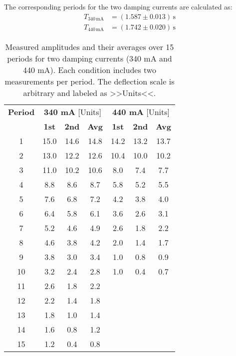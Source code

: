 The corresponding periods for the two damping currents are calculated as:
\begin{equation}
    \boxed{
        \begin{aligned}
        T_{340\,\mathrm{mA}} &= (1.587 \pm 0.013)\,\mathrm{s} \\
        T_{440\,\mathrm{mA}} &= (1.742 \pm 0.020)\,\mathrm{s}
    \end{aligned}
    }
\end{equation}

\begin{table}[h!]
    \centering
    \begin{tabular}{c|ccc|ccc}
        \hline
        \textbf{Period} & \multicolumn{3}{c|}{\textbf{340 mA} [Units]} & \multicolumn{3}{c}{\textbf{440 mA} [Units]} \\
        \cline{2-7}
        & \textbf{1st} & \textbf{2nd} & \textbf{Avg} & \textbf{1st} & \textbf{2nd} & \textbf{Avg} \\
        \hline
        1  & 15.0 & 14.6 & 14.8 & 14.2 & 13.2 & 13.7 \\
        2  & 13.0 & 12.2 & 12.6 & 10.4 & 10.0 & 10.2 \\
        3  & 11.0 & 10.2 & 10.6 & 8.0  & 7.4  & 7.7  \\
        4  & 8.8  & 8.6  & 8.7  & 5.8  & 5.2  & 5.5  \\
        5  & 7.6  & 6.8  & 7.2  & 4.2  & 3.8  & 4.0  \\
        6  & 6.4  & 5.8  & 6.1  & 3.6  & 2.6  & 3.1  \\
        7  & 5.2  & 4.6  & 4.9  & 2.6  & 1.8  & 2.2  \\
        8  & 4.6  & 3.8  & 4.2  & 2.0  & 1.4  & 1.7  \\
        9  & 3.8  & 3.0  & 3.4  & 1.0  & 0.8  & 0.9  \\
        10 & 3.2  & 2.4  & 2.8  & 1.0  & 0.4  & 0.7  \\
        11 & 2.6  & 1.8  & 2.2  &      &      &      \\
        12 & 2.2  & 1.4  & 1.8  &      &      &      \\
        13 & 1.8  & 1.0  & 1.4  &      &      &      \\
        14 & 1.6  & 0.8  & 1.2  &      &      &      \\
        15 & 1.2  & 0.4  & 0.8  &      &      &      \\
        \hline
    \end{tabular}
    \caption{Measured amplitudes and their averages over 15 periods for two damping currents (340 mA and 440 mA). Each condition includes two measurements per period. The deflection scale is arbitrary and labeled as >>Units<<.}
    \label{tab:comparison_340_440_avg}
\end{table}






